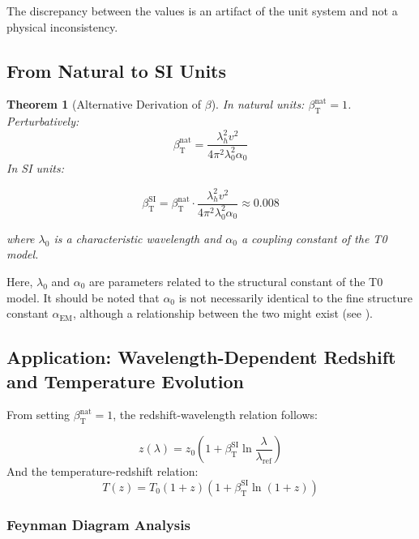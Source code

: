 \documentclass[12pt,a4paper]{article}
\newcommand{\alphaEM}{\alpha_{\text{EM}}}
\newcommand{\betaT}{\beta_{\text{T}}}
\newtheorem{theorem}{Theorem}[section]
\begin{document}
	The discrepancy between the values is an artifact of the unit system and not a physical inconsistency.
	
	\subsection{From Natural to SI Units}
	
	\begin{theorem}[Alternative Derivation of \(\beta\)]
		In natural units: \(\betaT^{\text{nat}} = 1\). Perturbatively:
		\begin{equation}
			\betaT^{\text{nat}} = \frac{\lambda_h^2 v^2}{4\pi^2 \lambda_0^2 \alpha_0}
		\end{equation}
		In SI units:
		
		\begin{equation}
			\betaT^{\text{SI}} = \betaT^{\text{nat}} \cdot \frac{\lambda_h^2 v^2}{4\pi^2 \lambda_0^2 \alpha_0} \approx 0.008
		\end{equation}	
		
		where \(\lambda_0\) is a characteristic wavelength and \(\alpha_0\) a coupling constant of the T0 model.
	\end{theorem}
	
	Here, \(\lambda_0\) and \(\alpha_0\) are parameters related to the structural constant of the T0 model. It should be noted that \(\alpha_0\) is not necessarily identical to the fine structure constant \(\alphaEM\), although a relationship between the two might exist (see \cite{pascher_alphabeta_2025}).
	
	\subsection{Application: Wavelength-Dependent Redshift and Temperature Evolution}
	
	From setting \(\betaT^{\text{nat}} = 1\), the redshift-wavelength relation follows:
	
	\begin{equation}
		z(\lambda) = z_0 \left(1 + \betaT^{\text{SI}} \ln \frac{\lambda}{\lambda_{\text{ref}}}\right)
	\end{equation}
	And the temperature-redshift relation:
	\begin{equation}
		T(z) = T_0 (1 + z) (1 + \betaT^{\text{SI}} \ln(1 + z))
	\end{equation}
	
	\subsubsection{Feynman Diagram Analysis}
	
\end{document}
